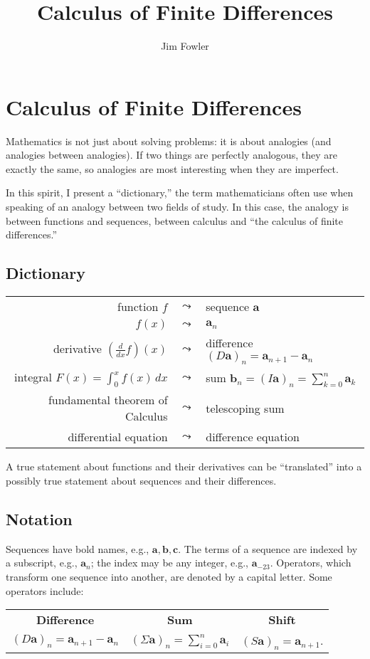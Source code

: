 \documentclass[12pt]{article}
\title{Calculus of Finite Differences}
\author{Jim Fowler}
\theoremstyle{definition}
\begin{document}
\section*{Calculus of Finite Differences}

Mathematics is not just about solving problems: it is about analogies
(and analogies between analogies).  If two things are perfectly
analogous, they are exactly the same, so analogies are most
interesting when they are imperfect.

In this spirit, I present a ``dictionary,'' the term mathematicians
often use when speaking of an analogy between two fields of study.  In
this case, the analogy is between functions and sequences, between
calculus and ``the calculus of finite differences.''

\subsection*{Dictionary}
\begin{center}
\begin{tabular}{rcl}
function $f$ & $\leadsto$ & sequence $\mathbf{a}$ \\
$f(x)$ & $\leadsto$ & $\mathbf{a}_n$ \\
derivative $\left(\frac{d}{dx}f\right)(x)$ & $\leadsto$ & difference $(D\mathbf{a})_n = \mathbf{a}_{n+1} - \mathbf{a}_n$ \\
integral $F(x) = \displaystyle\int_0^x f(x) \, dx$ & $\leadsto$ & sum $\mathbf{b}_n = (I\mathbf{a})_n = \displaystyle\sum_{k=0}^n \mathbf{a}_k$ \\
fundamental theorem of Calculus &$\leadsto$& telescoping sum \\
differential equation &$\leadsto$& difference equation \\
\end{tabular}
\end{center}
A true statement about functions and their derivatives can be
``translated'' into a possibly true statement about sequences and
their differences.

\subsection*{Notation}

Sequences have bold names, e.g., $\mathbf{a}, \mathbf{b}, \mathbf{c}$.
The terms of a sequence are indexed by a subscript, e.g.,
$\mathbf{a}_n$; the index may be any integer, e.g.,
$\mathbf{a}_{-23}$.  Operators, which transform one sequence into
another, are denoted by a capital letter.  Some operators include:
\begin{center}
\begin{tabular}{ccc}
\textbf{Difference} & \textbf{Sum} & \textbf{Shift} \\
$\left(D\mathbf{a}\right)_n = \mathbf{a}_{n+1} - \mathbf{a}_n$ &
$\left(\Sigma \mathbf{a}\right)_n = \displaystyle\sum_{i=0}^n \mathbf{a}_i$ &
$(S\mathbf{a})_n = \mathbf{a}_{n+1}$.
\end{tabular}
\end{center}
\end{document}
